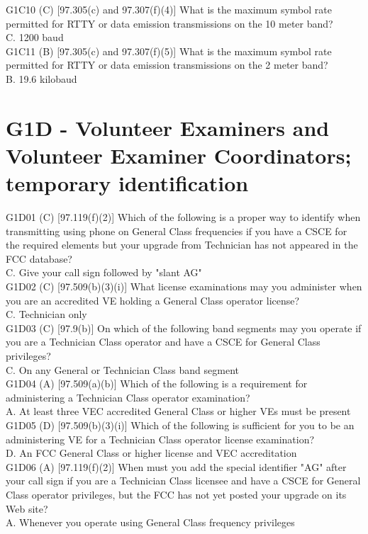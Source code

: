 \documentclass[12pt,letterpaper]{report}
\begin{document}
G1C10 (C) [97.305(c) and 97.307(f)(4)] What is the maximum symbol rate permitted for RTTY or data emission transmissions on the 10 meter band?\\
C. 1200 baud\\

G1C11 (B) [97.305(c) and 97.307(f)(5)] What is the maximum symbol rate permitted for RTTY or data emission transmissions on the 2 meter band?\\
B. 19.6 kilobaud\\

\section{G1D - Volunteer Examiners and Volunteer Examiner Coordinators; temporary identification}

G1D01 (C) [97.119(f)(2)] Which of the following is a proper way to identify when transmitting using phone on General Class frequencies if you have a CSCE for the required elements but your upgrade from Technician has not appeared in the FCC database?\\
C. Give your call sign followed by "slant AG"\\

G1D02 (C) [97.509(b)(3)(i)] What license examinations may you administer when you are an accredited VE holding a General Class operator license?\\
C. Technician only\\

G1D03 (C) [97.9(b)] On which of the following band segments may you operate if you are a Technician Class operator and have a CSCE for General Class privileges?\\
C. On any General or Technician Class band segment\\

G1D04 (A) [97.509(a)(b)] Which of the following is a requirement for administering a Technician Class operator examination?\\
A. At least three VEC accredited General Class or higher VEs must be present \\

G1D05 (D) [97.509(b)(3)(i)] Which of the following is sufficient for you to be an administering VE for a Technician Class operator license examination?\\
D. An FCC General Class or higher license and VEC accreditation\\

G1D06 (A) [97.119(f)(2)] When must you add the special identifier "AG" after your call sign if you are a Technician Class licensee and have a CSCE for General Class operator privileges, but the FCC has not yet posted your upgrade on its Web site?\\
A. Whenever you operate using General Class frequency privileges \\
\end{document}
